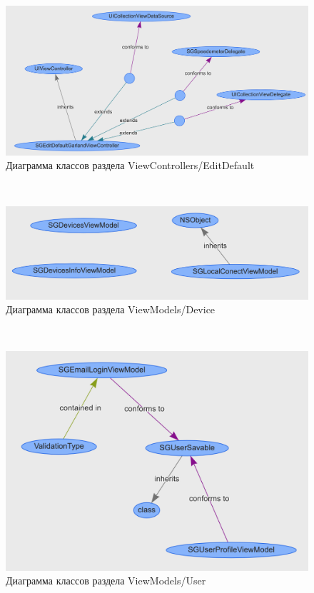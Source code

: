~
\begin{figure}[H]
\centering
	\includegraphics[scale=0.5]{figures/diagrams/class/vc_editDefault.png}
	\caption{Диаграмма классов раздела ViewControllers/EditDefault}
	\label{fig:appendices:classDiagram:vc_editDefault}
\end{figure}
~
\begin{figure}[H]
\centering
	\includegraphics[scale=0.5]{figures/diagrams/class/vm_device.png}
	\caption{Диаграмма классов раздела ViewModels/Device}
	\label{fig:appendices:classDiagram:vm_device}
\end{figure}
~
\begin{figure}[H]
\centering
	\includegraphics[scale=0.5]{figures/diagrams/class/vm_user.png}
	\caption{Диаграмма классов раздела ViewModels/User}
	\label{fig:appendices:classDiagram:vm_user}
\end{figure}